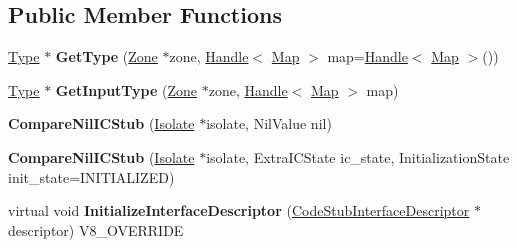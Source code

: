 \subsection*{Public Member Functions}
\begin{DoxyCompactItemize}
\item 
\hypertarget{classv8_1_1internal_1_1_compare_nil_i_c_stub_ac47cfe7e13a66c5e1d8f3c46b5d899b4}{}\hyperlink{classv8_1_1internal_1_1_type_impl}{Type} $\ast$ {\bfseries Get\+Type} (\hyperlink{classv8_1_1internal_1_1_zone}{Zone} $\ast$zone, \hyperlink{classv8_1_1internal_1_1_handle}{Handle}$<$ \hyperlink{classv8_1_1internal_1_1_map}{Map} $>$ map=\hyperlink{classv8_1_1internal_1_1_handle}{Handle}$<$ \hyperlink{classv8_1_1internal_1_1_map}{Map} $>$())\label{classv8_1_1internal_1_1_compare_nil_i_c_stub_ac47cfe7e13a66c5e1d8f3c46b5d899b4}

\item 
\hypertarget{classv8_1_1internal_1_1_compare_nil_i_c_stub_a3bbd68068f086e350119dbd0fa41b714}{}\hyperlink{classv8_1_1internal_1_1_type_impl}{Type} $\ast$ {\bfseries Get\+Input\+Type} (\hyperlink{classv8_1_1internal_1_1_zone}{Zone} $\ast$zone, \hyperlink{classv8_1_1internal_1_1_handle}{Handle}$<$ \hyperlink{classv8_1_1internal_1_1_map}{Map} $>$ map)\label{classv8_1_1internal_1_1_compare_nil_i_c_stub_a3bbd68068f086e350119dbd0fa41b714}

\item 
\hypertarget{classv8_1_1internal_1_1_compare_nil_i_c_stub_ae1a3fe1e60528d1c9611b261e5e50cf9}{}{\bfseries Compare\+Nil\+I\+C\+Stub} (\hyperlink{classv8_1_1internal_1_1_isolate}{Isolate} $\ast$isolate, Nil\+Value nil)\label{classv8_1_1internal_1_1_compare_nil_i_c_stub_ae1a3fe1e60528d1c9611b261e5e50cf9}

\item 
\hypertarget{classv8_1_1internal_1_1_compare_nil_i_c_stub_a0042fcebbb2d8fc29a68c833f30b688a}{}{\bfseries Compare\+Nil\+I\+C\+Stub} (\hyperlink{classv8_1_1internal_1_1_isolate}{Isolate} $\ast$isolate, Extra\+I\+C\+State ic\+\_\+state, Initialization\+State init\+\_\+state=I\+N\+I\+T\+I\+A\+L\+I\+Z\+E\+D)\label{classv8_1_1internal_1_1_compare_nil_i_c_stub_a0042fcebbb2d8fc29a68c833f30b688a}

\item 
\hypertarget{classv8_1_1internal_1_1_compare_nil_i_c_stub_a696d48819383374ea7ea66209187f09a}{}virtual void {\bfseries Initialize\+Interface\+Descriptor} (\hyperlink{classv8_1_1internal_1_1_code_stub_interface_descriptor}{Code\+Stub\+Interface\+Descriptor} $\ast$descriptor) V8\+\_\+\+O\+V\+E\+R\+R\+I\+D\+E\label{classv8_1_1internal_1_1_compare_nil_i_c_stub_a696d48819383374ea7ea66209187f09a}


\end{DoxyCompactItemize}

